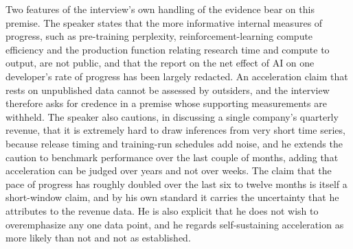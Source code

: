 \documentclass[11pt]{article}
\begin{document}
Two features of the interview's own handling of the evidence bear on this premise. The speaker states that the more informative internal measures of progress, such as pre-training perplexity, reinforcement-learning compute efficiency and the production function relating research time and compute to output, are not public, and that the report on the net effect of AI on one developer's rate of progress has been largely redacted. An acceleration claim that rests on unpublished data cannot be assessed by outsiders, and the interview therefore asks for credence in a premise whose supporting measurements are withheld. The speaker also cautions, in discussing a single company's quarterly revenue, that it is extremely hard to draw inferences from very short time series, because release timing and training-run schedules add noise, and he extends the caution to benchmark performance over the last couple of months, adding that acceleration can be judged over years and not over weeks. The claim that the pace of progress has roughly doubled over the last six to twelve months is itself a short-window claim, and by his own standard it carries the uncertainty that he attributes to the revenue data. He is also explicit that he does not wish to overemphasize any one data point, and he regards self-sustaining acceleration as more likely than not and not as established.
\end{document}
